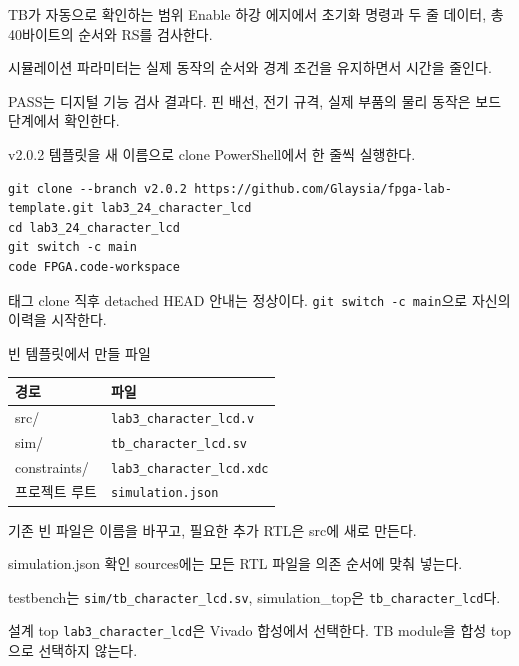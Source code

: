 \begin{frame}{TB가 자동으로 확인하는 범위}
\small
Enable 하강 에지에서 초기화 명령과 두 줄 데이터, 총 40바이트의 순서와 RS를 검사한다.\par\vspace{0.28cm}
시뮬레이션 파라미터는 실제 동작의 순서와 경계 조건을 유지하면서 시간을 줄인다.\par\vspace{0.28cm}
PASS는 디지털 기능 검사 결과다. 핀 배선, 전기 규격, 실제 부품의 물리 동작은 보드 단계에서 확인한다.
\end{frame}

\begin{frame}[fragile,label=start]{v2.0.2 템플릿을 새 이름으로 clone}
\small
PowerShell에서 한 줄씩 실행한다.
\begin{lstlisting}[language={}]
git clone --branch v2.0.2 https://github.com/Glaysia/fpga-lab-template.git lab3_24_character_lcd
cd lab3_24_character_lcd
git switch -c main
code FPGA.code-workspace
\end{lstlisting}
태그 clone 직후 detached HEAD 안내는 정상이다. \texttt{git switch -c main}으로 자신의 이력을 시작한다.
\end{frame}

\begin{frame}{빈 템플릿에서 만들 파일}
\small
\begin{center}\renewcommand{\arraystretch}{1.35}\begin{tabular}{>{\raggedright\arraybackslash}p{2.25cm}p{7.2cm}}
경로 & 파일\\\hline
src/ & \texttt{lab3\_character\_lcd.v}\\
sim/ & \texttt{tb\_character\_lcd.sv}\\
constraints/ & \texttt{lab3\_character\_lcd.xdc}\\
프로젝트 루트 & \texttt{simulation.json}\\
\end{tabular}\end{center}
기존 빈 파일은 이름을 바꾸고, 필요한 추가 RTL은 src에 새로 만든다.
\end{frame}

\begin{frame}{simulation.json 확인}
\small
sources에는 모든 RTL 파일을 의존 순서에 맞춰 넣는다.\par\vspace{0.25cm}
testbench는 \texttt{sim/tb\_character\_lcd.sv}, simulation\_top은 \texttt{tb\_character\_lcd}다.\par\vspace{0.25cm}
설계 top \texttt{lab3\_character\_lcd}은 Vivado 합성에서 선택한다. TB module을 합성 top으로 선택하지 않는다.
\end{frame}

